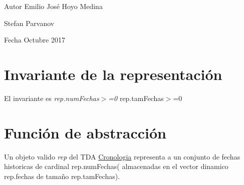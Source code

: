 \begin{DoxyAuthor}{Autor}
Emilio José Hoyo Medina 

Stefan Parvanov 
\end{DoxyAuthor}
\begin{DoxyDate}{Fecha}
Octubre 2017
\end{DoxyDate}
\hypertarget{repBConjunto_invConjunto}{}\section{Invariante de la representación}\label{repBConjunto_invConjunto}
El invariante es {\itshape rep.\+num\+Fechas$>$=0} rep.\+tam\+Fechas$>$=0\hypertarget{repBConjunto_faConjunto}{}\section{Función de abstracción}\label{repBConjunto_faConjunto}
Un objeto valido {\itshape rep} del T\+DA \hyperlink{classCronologia}{Cronologia} representa a un conjunto de fechas historicas de cardinal rep.\+num\+Fechas( almacenadas en el vector dinamico rep.\+fechas de tamaño rep.\+tam\+Fechas). 